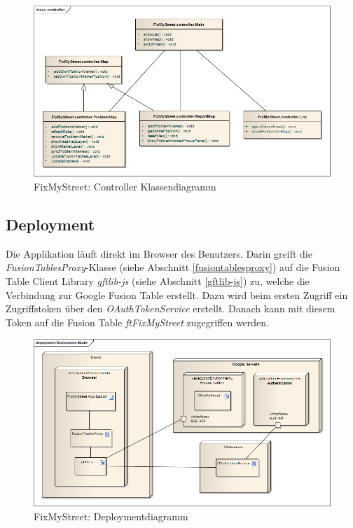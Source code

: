 \begin{figure}[H]
	\centering
	\includegraphics[width=\textwidth]{images/usecase2-fixmystreet/uml/fixmystreet-controller-classmodel}
	\caption{FixMyStreet: Controller Klassendiagramm}
	\label{fixmystreet-controller-classmodel}
\end{figure}

\subsection{Deployment}
Die Applikation läuft direkt im Browser des Benutzers. Darin greift die \emph{FusionTablesProxy}-Klasse (siehe Abschnitt \ref{fusiontablesproxy}) auf die Fusion Table Client Library \emph{gftlib-js} (siehe Abschnitt \ref{gftlib-js}) zu, welche die Verbindung zur Google Fusion Table erstellt. Dazu wird beim ersten Zugriff ein Zugriffstoken über den \emph{OAuthTokenService} erstellt. Danach kann mit diesem Token auf die Fusion Table \emph{ftFixMyStreet} zugegriffen werden.

\begin{figure}[H]
	\centering
	\includegraphics[width=\textwidth]{images/usecase2-fixmystreet/uml/fixmystreet-deploymentmodel}
	\caption{FixMyStreet: Deploymentdiagramm}
	\label{fixmystreet-deploymentmodel}
\end{figure}

